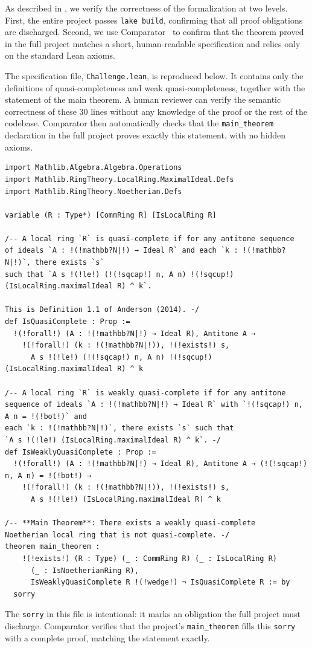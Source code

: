 \documentclass[]{pkuai4m}
\theoremstyle{plain}
\theoremstyle{definition}
\begin{document}
As described in , we verify the correctness of the formalization at two levels. First, the entire project passes \texttt{lake build}, confirming that all proof obligations are discharged. Second, we use Comparator~\cite{comparator} to confirm that the theorem proved in the full project matches a short, human-readable specification and relies only on the standard Lean axioms.

The specification file, \texttt{Challenge.lean}, is reproduced below. It contains only the definitions of quasi-completeness and weak quasi-completeness, together with the statement of the main theorem. A human reviewer can verify the semantic correctness of these 30 lines without any knowledge of the proof or the rest of the codebase. Comparator then automatically checks that the \texttt{main\_theorem} declaration in the full project proves exactly this statement, with no hidden axioms.

\begin{Verbatim}[fontsize=\small,commandchars=!?\|]
import Mathlib.Algebra.Algebra.Operations
import Mathlib.RingTheory.LocalRing.MaximalIdeal.Defs
import Mathlib.RingTheory.Noetherian.Defs

variable (R : Type*) [CommRing R] [IsLocalRing R]

/-- A local ring `R` is quasi-complete if for any antitone sequence
of ideals `A : !(!mathbb?N|!) → Ideal R` and each `k : !(!mathbb?N|!)`, there exists `s`
such that `A s !(!le!) (!(!sqcap!) n, A n) !(!sqcup!) (IsLocalRing.maximalIdeal R) ^ k`.

This is Definition 1.1 of Anderson (2014). -/
def IsQuasiComplete : Prop :=
  !(!forall!) (A : !(!mathbb?N|!) → Ideal R), Antitone A →
    !(!forall!) (k : !(!mathbb?N|!)), !(!exists!) s,
      A s !(!le!) (!(!sqcap!) n, A n) !(!sqcup!) (IsLocalRing.maximalIdeal R) ^ k

/-- A local ring `R` is weakly quasi-complete if for any antitone
sequence of ideals `A : !(!mathbb?N|!) → Ideal R` with `!(!sqcap!) n, A n = !(!bot!)` and
each `k : !(!mathbb?N|!)`, there exists `s` such that
`A s !(!le!) (IsLocalRing.maximalIdeal R) ^ k`. -/
def IsWeaklyQuasiComplete : Prop :=
  !(!forall!) (A : !(!mathbb?N|!) → Ideal R), Antitone A → (!(!sqcap!) n, A n) = !(!bot!) →
    !(!forall!) (k : !(!mathbb?N|!)), !(!exists!) s,
      A s !(!le!) (IsLocalRing.maximalIdeal R) ^ k

/-- **Main Theorem**: There exists a weakly quasi-complete
Noetherian local ring that is not quasi-complete. -/
theorem main_theorem :
    !(!exists!) (R : Type) (_ : CommRing R) (_ : IsLocalRing R)
      (_ : IsNoetherianRing R),
      IsWeaklyQuasiComplete R !(!wedge!) ¬ IsQuasiComplete R := by
  sorry
\end{Verbatim}
\noindent The \texttt{sorry} in this file is intentional: it marks an obligation the full project must discharge. Comparator verifies that the project's \texttt{main\_theorem} fills this \texttt{sorry} with a complete proof, matching the statement exactly.
\let\clearpage\relax
\end{document}
